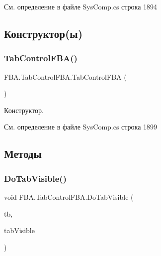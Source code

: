 См. определение в файле Sys\+Comp.\+cs строка 1894



\subsection{Конструктор(ы)}
\mbox{\label{class_f_b_a_1_1_tab_control_f_b_a_a61249027c9ef1b63f0d75af84de49feb}} 
\subsubsection{\texorpdfstring{Tab\+Control\+F\+B\+A()}{TabControlFBA()}}
{\footnotesize\ttfamily F\+B\+A.\+Tab\+Control\+F\+B\+A.\+Tab\+Control\+F\+BA (\begin{DoxyParamCaption}{ }\end{DoxyParamCaption})}



Конструктор. 



См. определение в файле Sys\+Comp.\+cs строка 1899



\subsection{Методы}
\mbox{\label{class_f_b_a_1_1_tab_control_f_b_a_a581638e5b0ff6e51652315280eb20d0b}} 
\subsubsection{\texorpdfstring{Do\+Tab\+Visible()}{DoTabVisible()}}
{\footnotesize\ttfamily void F\+B\+A.\+Tab\+Control\+F\+B\+A.\+Do\+Tab\+Visible (\begin{DoxyParamCaption}\item[{Tab\+Page}]{tb,  }\item[{bool}]{tab\+Visible }\end{DoxyParamCaption})}



